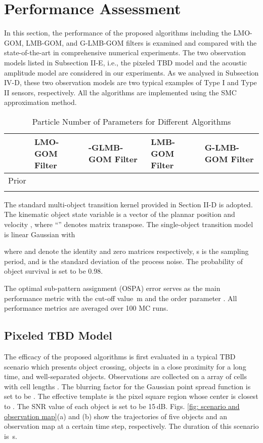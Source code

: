 \documentclass[journal]{IEEEtran}
\begin{document}
{ \section{Performance Assessment}\label{chp:7}
 In this section,  the performance of the  proposed algorithms including the LMO-GOM,  LMB-GOM, and G-LMB-GOM filters is examined and compared with the state-of-the-art in comprehensive numerical experiments. The two observation models listed in Subsection II-E, i.e., the pixeled TBD model and the acoustic amplitude model are considered in our experiments.  As we  analysed in Subsection IV-D, these two observation models are two typical examples of Type I and Type II sensors, respectively.  All the algorithms are implemented using the SMC approximation method. 


\begin{table}
\caption{ Particle Number of  Parameters for  Different Algorithms}
\begin{tabular}{p{0.85cm}|p{1.375cm}|p{1.375cm}|p{1.375cm}|p{1.375cm}}
\hline\hline
&
LMO-GOM Filter & -GLMB-GOM Filter&LMB-GOM Filter& G-LMB-GOM Filter\\
\hline
\multirow{3}{*}{Prior} 
&   &  &  &  \\
\cline{2-5}
&  &  &  & \\
\hline
\multirow{3}{*}{Posterior} 
&   &  &  &  \\
\cline{2-5}
&  &  &  &  \\
\hline
\end{tabular}
\end{table}

The standard  multi-object transition kernel provided in Section II-D is adopted. The kinematic object state variable is a vector of the plannar position and velocity , where ``'' denotes matrix transpose. The single-object transition model is  linear Gaussian with

where  and  denote the  identity and zero matrices respectively,  s is the sampling period, and  is the standard deviation of the process noise.  The probability of object survival   is set to be 0.98. 



The optimal sub-pattern assignment (OSPA) error \cite{refr:OSPA} serves as the main performance metric with the cut-off value \,m and the order parameter . All performance metrics are averaged over 100 MC runs.
\subsection{Pixeled TBD Model}
 The  efficacy of the proposed algorithms   is  first evaluated  in a typical TBD scenario which presents object crossing, objects in a close proximity for a long time,  and  well-separated objects.  Observations are collected on a   array of cells with cell lengths . The blurring factor for the Gaussian point spread function is set to be . The effective template  is the  pixel  square region whose center is closest to .  The SNR value of each object is set to be 15\,dB.  Figs. \ref{fig: scenario and observation map}(a) and (b) show the trajectories of five objects and an  observation map at a certain time step, respectively. 
 The duration of this scenario is  \,s.
 
}
\end{document}

